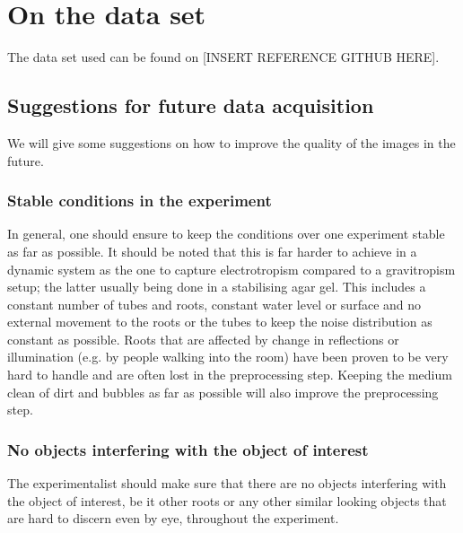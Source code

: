 

\chapter{On the data set}

The data set used can be found on [INSERT REFERENCE GITHUB HERE].

\section{Suggestions for future data acquisition}

We will give some suggestions on how to improve the quality of the images in the future.


\subsection{Stable conditions in the experiment}

In general, one should ensure to keep the conditions over one experiment stable as far as possible. It should be noted that this is far harder to achieve in a dynamic system as the one to capture electrotropism compared to a gravitropism setup; the latter usually being done in a stabilising agar gel. 
This includes a constant number of tubes and roots, constant water level or surface and no external movement to the roots or the tubes to keep the noise distribution as constant as possible. Roots that are affected by change in reflections or illumination (e.g. by people walking into the room) have been proven to be very hard to handle and are often lost in the preprocessing step. 
Keeping the medium clean of dirt and bubbles as far as possible will also improve the preprocessing step. 


\subsection{No objects interfering with the object of interest}

The experimentalist should make sure that there are no objects interfering with the object of interest, be it other roots or any other similar looking objects that are hard to discern even by eye, throughout the experiment.


